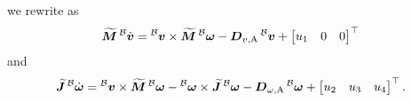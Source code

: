 we rewrite  as
\begin{equation}
	\label{eq:eom-translational-with-input}
	\Mbs \vlinbodydot =
	\vlinbody \times \Mbs \vangbody
	-\Dvadded \vlinbody
	+
	\begin{bmatrix}
		u_1 & 0 & 0
	\end{bmatrix}^\top
\end{equation}
and
\begin{equation}
	\label{eq:eom-rotational-with-input}
	\Jbs \vangbodydot =
	\vlinbody \times \Mbs \vangbody
	- \vangbody \times \Jbs \vangbody
	- \Domegaadded \vangbody
	+
	\begin{bmatrix}
		u_2 & u_3 & u_4
	\end{bmatrix}^\top
	.
\end{equation}





